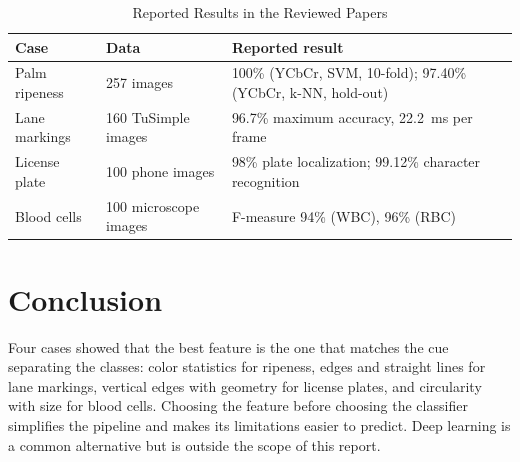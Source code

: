 \documentclass[lettersize,journal]{IEEEtran}
\begin{document}
\begin{table}[!t]
\caption{Reported Results in the Reviewed Papers}
\label{tab:results}
\centering
\footnotesize
\begin{tabular}{|p{1.5cm}|p{2.0cm}|p{4.2cm}|}
\hline
\textbf{Case} & \textbf{Data} & \textbf{Reported result}\\
\hline
Palm ripeness & 257 images & 100\% (YCbCr, SVM, 10-fold); 97.40\% (YCbCr, k-NN, hold-out)\\
\hline
Lane markings & 160 TuSimple images & 96.7\% maximum accuracy, 22.2~ms per frame\\
\hline
License plate & 100 phone images & 98\% plate localization; 99.12\% character recognition\\
\hline
Blood cells & 100 microscope images & F-measure 94\% (WBC), 96\% (RBC)\\
\hline
\end{tabular}
\end{table}

\section{Conclusion}
Four cases showed that the best feature is the one that matches the cue separating the classes: color statistics for ripeness, edges and straight lines for lane markings, vertical edges with geometry for license plates, and circularity with size for blood cells. Choosing the feature before choosing the classifier simplifies the pipeline and makes its limitations easier to predict. Deep learning is a common alternative but is outside the scope of this report.
\end{document}
